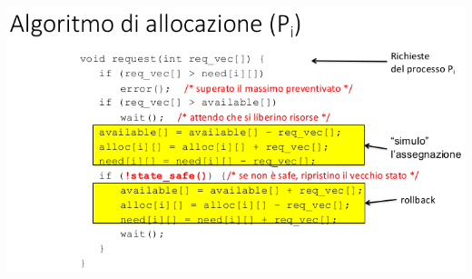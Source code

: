 \documentclass[a4paper, 12pt]{book}
\begin{document}
\begin{center}
    \includegraphics[width=1\textwidth]{banchiere1.png}
\end{center}
\end{document}
